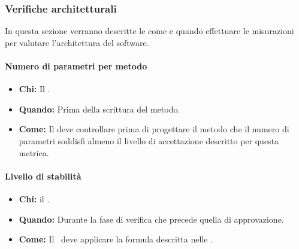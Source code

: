\subsubsection{Verifiche architetturali}
In questa sezione verranno descritte le come e quando effettuare le misurazioni per valutare l'architettura del software.

\paragraph{Numero di parametri per metodo}
\begin{itemize}
\item \textbf{Chi:} Il \Prog.
\item \textbf{Quando:} Prima della scrittura del metodo.
\item \textbf{Come:} Il \Prog deve controllare prima di progettare il metodo che il numero di parametri soddisfi almeno il livello di accettazione descritto per questa metrica.
\end{itemize}

\paragraph{Livello di stabilità}
\begin{itemize}
\item \textbf{Chi:} il \Ver.
\item \textbf{Quando:} Durante la fase di verifica che precede quella di approvazione.
\item \textbf{Come:} Il \Ver\ deve applicare la formula descritta nelle \NdP.
\end{itemize}
